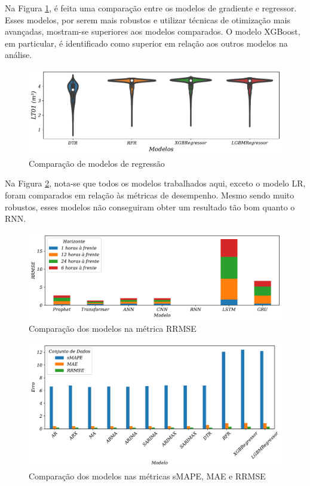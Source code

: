 Na Figura \ref{fig:violin-lr-xgb-lgbm-rf}, é feita uma comparação entre os modelos de gradiente e regressor. Esses modelos, por serem mais robustos e utilizar técnicas de otimização mais avançadas, mostram-se superiores aos modelos comparados. O modelo XGBoost, em particular, é identificado como superior em relação aos outros modelos na análise.

\begin{figure}[!htb]
	\centering
	\caption{Comparação de modelos de regressão}\label{fig:violin-lr-xgb-lgbm-rf}
	\includegraphics[width=\linewidth]{Resultados/Figuras/violin-LR-XGB-LGBM-RF}
	
\end{figure}

Na Figura \ref{fig:rrmse_comparar}, nota-se que todos os modelos trabalhados aqui, exceto o modelo LR, foram comparados em relação às métricas de desempenho. Mesmo sendo muito robustos, esses modelos não conseguiram obter um resultado tão bom quanto o RNN.
\begin{figure}[!htb]
	\centering
	\caption{Comparação dos modelos na métrica RRMSE\label{fig:rrmse_comparar}}
	\includegraphics[width=\linewidth]{Resultados/Figuras/rrmse_comparar}
\end{figure}

\begin{figure}[!htb]
	\centering
	\caption{Comparação dos modelos nas métricas sMAPE, MAE e RRMSE\label{fig:basic_comparar}}
	\includegraphics[width=\linewidth]{Resultados/Figuras/basic_comparar}
\end{figure}



